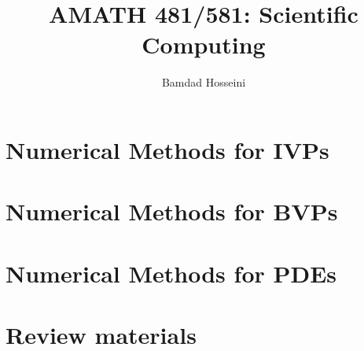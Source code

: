 \documentclass[a4,12pt,oneside,openany,oldfontcommands]{memoir}
\title{AMATH 481/581: Scientific Computing}
\author{Bamdad Hosseini}
\begin{document}
\maketitle




\newpage

\begin{KeepFromToc}
\tableofcontents
\end{KeepFromToc}







\part{ \; Numerical Methods for IVPs}













\part{ \; Numerical Methods for BVPs}








\part{ \; Numerical Methods for PDEs}












\part{ \; Review materials}

\appendix




\end{document}
